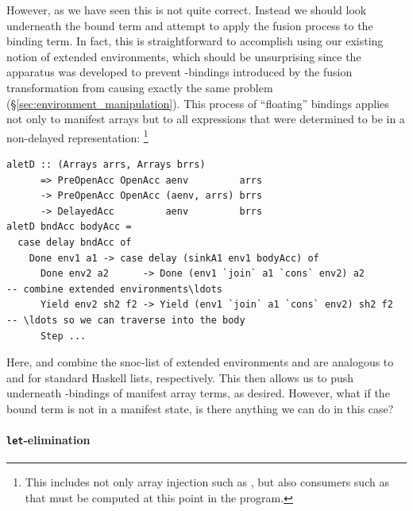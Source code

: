 However, as we have seen this is not quite correct. Instead we should look
underneath the bound term and attempt to apply the fusion process to the binding
term. In fact, this is straightforward to accomplish using our existing notion
of extended environments, which should be unsurprising since the 
apparatus was developed to prevent -bindings introduced by the
fusion transformation from causing exactly the same problem
(\S\ref{sec:environment_manipulation}). This process of ``floating'' bindings
applies not only to manifest arrays but to all expressions that were determined
to be in a non-delayed representation:
\footnote{This includes not only array injection such as , but also
consumers such as  that must be computed at this point in the
program.}
%
\begin{lstlisting}[style=haskell]
aletD :: (Arrays arrs, Arrays brrs)
      => PreOpenAcc OpenAcc aenv         arrs
      -> PreOpenAcc OpenAcc (aenv, arrs) brrs
      -> DelayedAcc         aenv         brrs
aletD bndAcc bodyAcc =
  case delay bndAcc of
    Done env1 a1 -> case delay (sinkA1 env1 bodyAcc) of
      Done env2 a2      -> Done (env1 `join` a1 `cons` env2) a2        -- combine extended environments\ldots
      Yield env2 sh2 f2 -> Yield (env1 `join` a1 `cons` env2) sh2 f2   -- \ldots so we can traverse into the body
      Step ...
\end{lstlisting}
%
Here,  and  combine the snoc-list of extended
environments and are analogous to \code{(++)} and \code{(:)} for standard
Haskell lists, respectively. This then allows us to push underneath
-bindings of manifest array terms, as desired. However, what if the
bound term is not in a manifest state, is there anything we can do in this case?

\paragraph{\texttt{\bf let}-elimination}

